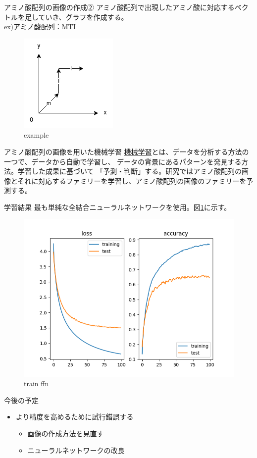 \documentclass[dvipdfmx]{beamer}
\begin{document}
  \begin{frame}{アミノ酸配列の画像の作成②}
    アミノ酸配列で出現したアミノ酸に対応するベクトルを足していき、グラフを作成する。\\
    ex)アミノ酸配列：MTI
    \begin{figure}
      \centering
      \includegraphics[keepaspectratio, scale=0.5]{images/example.png}
      \caption{example}
    \end{figure}
  \end{frame}

  \begin{frame}{アミノ酸配列の画像を用いた機械学習}
    \href{https://www.nri.com/jp/knowledge/glossary/lst/ka/machine_learning}{機械学習}とは、データを分析する方法の一つで、データから自動で学習し、
    データの背景にあるパターンを発見する方法。学習した成果に基づいて
    「予測・判断」する。研究ではアミノ酸配列の画像とそれに対応するファミリーを学習し、アミノ酸配列の画像のファミリーを予測する。
  \end{frame}

  \begin{frame}{学習結果}
    最も単純な全結合ニューラルネットワークを使用。図\ref{fig:result}に示す。
    \begin{figure}[H]
      \centering
      \includegraphics[keepaspectratio, scale=0.5]{images/train_fnn.png}
      \caption{train ffn}
      \label{fig:result}
    \end{figure}
  \end{frame}

  \begin{frame}{今後の予定}
    \begin{itemize}
      \item より精度を高めるために試行錯誤する
      \begin{itemize}
        \item 画像の作成方法を見直す
        \item ニューラルネットワークの改良
      \end{itemize}
    \end{itemize}
  \end{frame}
\end{document}
